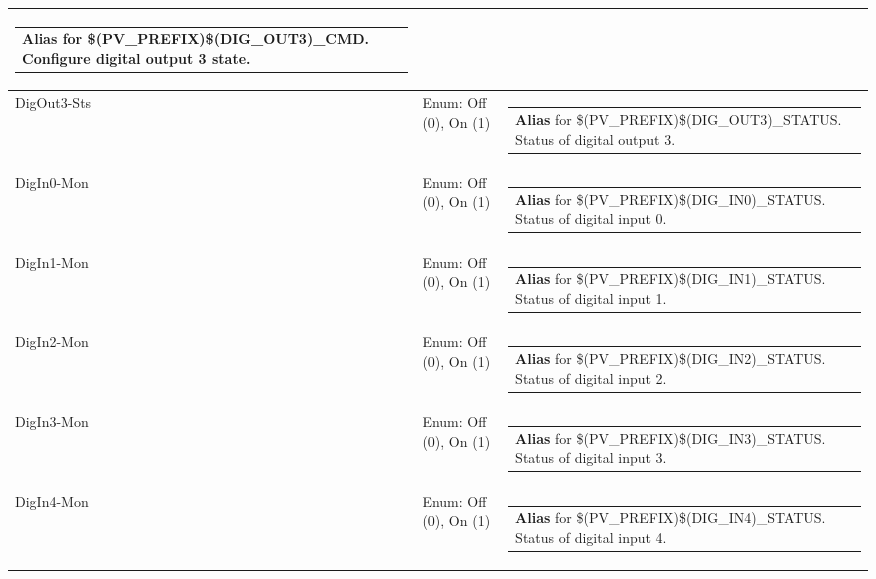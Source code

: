 \documentclass[openany]{article}
\begin{document}
\begin{longtable}{| m{4.5cm} m{2.5cm}  m{8.5cm} |}
\begin{tabular}{@{}m{6cm}@{}}
                \textbf{\color{blue} Alias} for \$(PV\_PREFIX)\$(DIG\_OUT3)\_CMD. Configure digital output 3 state.
            \end{tabular} \hypertarget{}{}\\ \hline
        DigOut3-Sts & Enum: Off (0), On (1) & \begin{tabular}{@{}m{6cm}@{}}
                \textbf{\color{blue} Alias} for \$(PV\_PREFIX)\$(DIG\_OUT3)\_STATUS. Status of digital output 3.
            \end{tabular} \hypertarget{pv:dig-in-0}{}\\ \hline
        DigIn0-Mon & Enum: Off (0), On (1) & \begin{tabular}{@{}m{6cm}@{}}
                \textbf{\color{blue} Alias} for \$(PV\_PREFIX)\$(DIG\_IN0)\_STATUS. Status of digital input 0.
            \end{tabular} \hypertarget{pv:dig-in-1}{}\\ \hline
        DigIn1-Mon & Enum: Off (0), On (1) & \begin{tabular}{@{}m{6cm}@{}}
                \textbf{\color{blue} Alias} for \$(PV\_PREFIX)\$(DIG\_IN1)\_STATUS. Status of digital input 1.
            \end{tabular} \hypertarget{pv:dig-in-2}{}\\ \hline
        DigIn2-Mon & Enum: Off (0), On (1) & \begin{tabular}{@{}m{6cm}@{}}
                \textbf{\color{blue} Alias} for \$(PV\_PREFIX)\$(DIG\_IN2)\_STATUS. Status of digital input 2.
            \end{tabular} \hypertarget{pv:dig-in-3}{}\\ \hline
        DigIn3-Mon & Enum: Off (0), On (1) & \begin{tabular}{@{}m{6cm}@{}}
                \textbf{\color{blue} Alias} for \$(PV\_PREFIX)\$(DIG\_IN3)\_STATUS. Status of digital input 3.
            \end{tabular} \hypertarget{pv:dig-in-4}{}\\ \hline
        DigIn4-Mon & Enum: Off (0), On (1) & \begin{tabular}{@{}m{6cm}@{}}
                \textbf{\color{blue} Alias} for \$(PV\_PREFIX)\$(DIG\_IN4)\_STATUS. Status of digital input 4.
            \end{tabular} \hypertarget{pv:dig-in-5}{}\\ \hline

\end{longtable}
\end{document}
